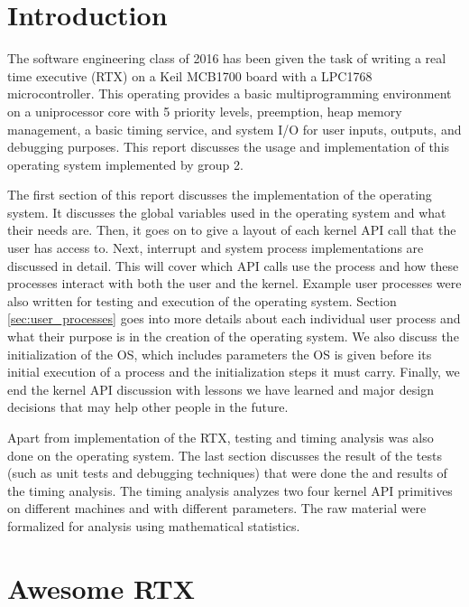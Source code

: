 \documentclass[12pt]{report}
\begin{document}
\tableofcontents
\listofalgorithms
\listoffigures



\part{Introduction}
The software engineering class of 2016 has been given the task of writing a real time executive (RTX) on a Keil MCB1700 board with a LPC1768 microcontroller. This operating provides a basic multiprogramming environment on a uniprocessor core with 5 priority levels, preemption, heap memory management, a basic timing service, and system I/O for user inputs, outputs, and debugging purposes. This report discusses the usage and implementation of this operating system implemented by group 2.

The first section of this report discusses the implementation of the operating system. It discusses the global variables used in the operating system and what their needs are. Then, it goes on to give a layout of each kernel API call that the user has access to. Next, interrupt and system process implementations are discussed in detail. This will cover which API calls use the process and how these processes interact with both the user and the kernel. Example user processes were also written for testing and execution of the operating system. Section \ref{sec:user_processes} goes into more details about each individual user process and what their purpose is in the creation of the operating system. We also discuss the initialization of the OS, which includes parameters the OS is given before its initial execution of a process and the initialization steps it must carry. Finally, we end the kernel API discussion with lessons we have learned and major design decisions that may help other people in the future.

Apart from implementation of the RTX, testing and timing analysis was also done on the operating system. The last section discusses the result of the tests (such as unit tests and debugging techniques) that were done the and results of the timing analysis. The timing analysis analyzes two four kernel API primitives on different machines and with different parameters. The raw material were formalized for analysis using mathematical statistics.



\part{Awesome RTX}
\end{document}
